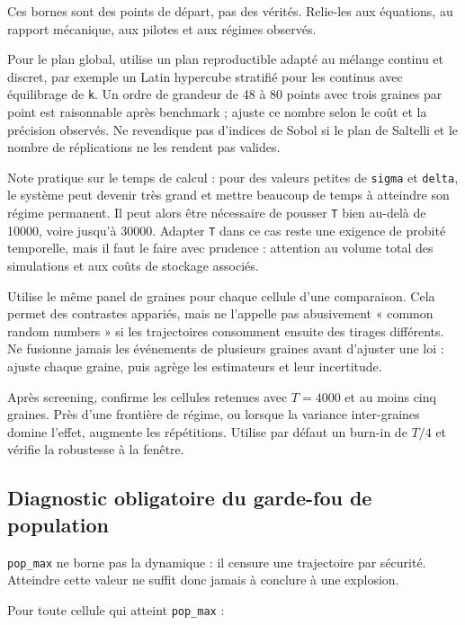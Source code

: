 \documentclass[11pt,a4paper]{article}
\newcommand{\code}[1]{\texttt{\color{navy}#1}}
\begin{document}
Ces bornes sont des points de départ, pas des vérités. Relie-les aux équations,
au rapport mécanique, aux pilotes et aux régimes observés.

Pour le plan global, utilise un plan reproductible adapté au mélange continu
et discret, par exemple un Latin hypercube stratifié pour les continus avec
équilibrage de \code{k}. Un ordre de grandeur de 48 à 80 points avec trois
graines par point est raisonnable après benchmark ; ajuste ce nombre selon le
coût et la précision observés. Ne revendique pas d'indices de Sobol si le plan
de Saltelli et le nombre de réplications ne les rendent pas valides.

Note pratique sur le temps de calcul : pour des valeurs petites de
\code{sigma} et \code{delta}, le système peut devenir très grand et mettre
beaucoup de temps à atteindre son régime permanent. Il peut alors être
nécessaire de pousser \code{T} bien au-delà de 10000, voire jusqu'à 30000.
Adapter \code{T} dans ce cas reste une exigence de probité temporelle, mais il
faut le faire avec prudence : attention au volume total des simulations et aux
coûts de stockage associés.

Utilise le même panel de graines pour chaque cellule d'une comparaison. Cela
permet des contrastes appariés, mais ne l'appelle pas abusivement « common
random numbers » si les trajectoires consomment ensuite des tirages différents.
Ne fusionne jamais les événements de plusieurs graines avant d'ajuster une
loi : ajuste chaque graine, puis agrège les estimateurs et leur incertitude.

Après screening, confirme les cellules retenues avec $T=4000$ et au moins cinq
graines. Près d'une frontière de régime, ou lorsque la variance inter-graines
domine l'effet, augmente les répétitions. Utilise par défaut un burn-in de
$T/4$ et vérifie la robustesse à la fenêtre.

\subsection{Diagnostic obligatoire du garde-fou de population}

\code{pop\_max} ne borne pas la dynamique : il censure une trajectoire par
sécurité. Atteindre cette valeur ne suffit donc jamais à conclure à une
explosion.

Pour toute cellule qui atteint \code{pop\_max} :
\end{document}
